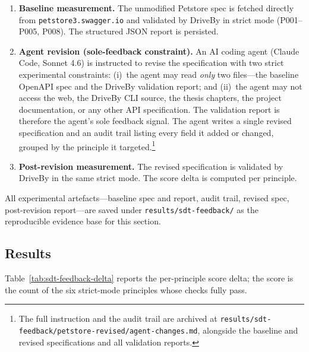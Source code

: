 \begin{enumerate}
    \item \textbf{Baseline measurement.} The unmodified Petstore spec is fetched directly from \texttt{petstore3.swagger.io} and validated by DriveBy in strict mode (P001--P005, P008). The structured JSON report is persisted.
    \item \textbf{Agent revision (sole-feedback constraint).} An AI coding agent (Claude Code, Sonnet 4.6) is instructed to revise the specification with two strict experimental constraints: (i)~the agent may read \emph{only} two files---the baseline OpenAPI spec and the DriveBy validation report; and (ii)~the agent may not access the web, the DriveBy CLI source, the thesis chapters, the project documentation, or any other API specification. The validation report is therefore the agent's sole feedback signal. The agent writes a single revised specification and an audit trail listing every field it added or changed, grouped by the principle it targeted.\footnote{The full instruction and the audit trail are archived at \texttt{results/sdt-feedback/petstore-revised/agent-changes.md}, alongside the baseline and revised specifications and all validation reports.}
    \item \textbf{Post-revision measurement.} The revised specification is validated by DriveBy in the same strict mode. The score delta is computed per principle.
\end{enumerate}

All experimental artefacts---baseline spec and report, audit trail, revised spec, post-revision report---are saved under \texttt{results/sdt-feedback/} as the reproducible evidence base for this section.

\subsection{Results}
\label{subsec:sdt-feedback-results}

Table~\ref{tab:sdt-feedback-delta} reports the per-principle score delta; the score is the count of the six strict-mode principles whose checks fully pass.

